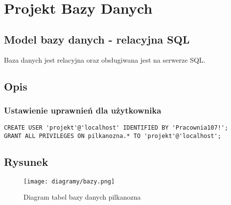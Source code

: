 \section{Projekt Bazy Danych}
    \subsection{Model bazy danych - relacyjna SQL}
        Baza danych jest relacyjna oraz obsługiwana jest na serwerze SQL.
    \subsection{Opis}

        \subsubsection{Ustawienie uprawnień dla użytkownika}
        \begin{lstlisting}
CREATE USER 'projekt'@'localhost' IDENTIFIED BY 'Pracownia107!'; 
GRANT ALL PRIVILEGES ON pilkanozna.* TO 'projekt'@'localhost';
        \end{lstlisting}

    \subsection{Rysunek}
        \begin{figure}[!htb]
            \centering
            \texttt{[image: diagramy/bazy.png]}
            \caption{Diagram tabel bazy danych pilkanozna}
        \end{figure}